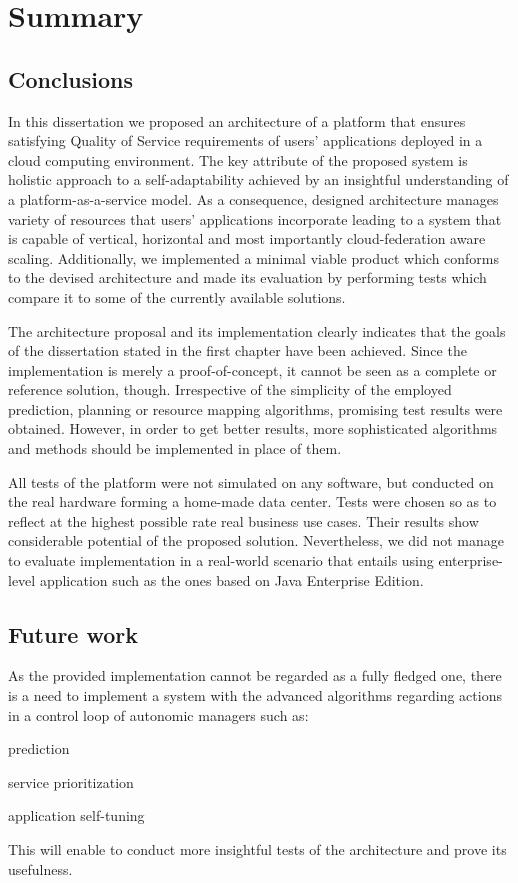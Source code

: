 \chapter{Summary}


\section{Conclusions}
In this dissertation we proposed an architecture of a platform that ensures satisfying Quality of Service requirements of users' applications deployed in a cloud computing environment. The key attribute of the proposed system is holistic approach to a self-adaptability achieved by an insightful understanding of a platform-as-a-service model. As a consequence, designed architecture manages variety of resources that users' applications incorporate leading to a system that is capable of vertical, horizontal and most importantly cloud-federation aware scaling. Additionally, we implemented a minimal viable product which conforms to the devised architecture and made its evaluation by performing tests which compare it to some of the currently available solutions.

The architecture proposal and its implementation clearly indicates that the goals of the dissertation stated in the first chapter have been achieved. Since the implementation is merely a proof-of-concept, it cannot be seen as a complete or reference solution, though. Irrespective of the simplicity of the employed prediction, planning or resource mapping algorithms, promising test results were obtained. However, in order to get better results, more sophisticated algorithms and methods should be implemented in place of them.

All tests of the platform were not simulated on any software, but conducted on the real hardware forming a home-made data center. Tests were chosen so as to reflect at the highest possible rate real business use cases. Their results show considerable potential of the proposed solution. Nevertheless, we did not manage to evaluate implementation in a real-world scenario that entails using enterprise-level application such as the ones based on Java Enterprise Edition.

\section{Future work}
As the provided implementation cannot be regarded as a fully fledged one, there is a need to implement a system with the advanced algorithms regarding actions in a control loop of autonomic managers such as:
\begin{inparaenum}[1)]
  \item prediction
  \item service prioritization
  \item application self-tuning
\end{inparaenum}
This will enable to conduct more insightful tests of the architecture and prove its usefulness.

